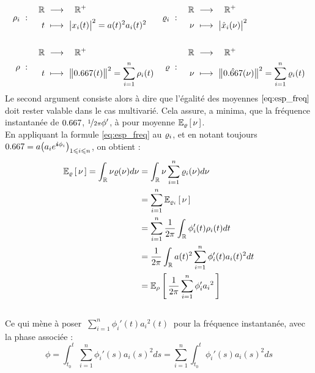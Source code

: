 \begin{align*}%
	\densit_i\ &:\quad \begin{aligned}\R\ &\lr\quad \R^+ \\ t\ &\longmapsto\ \big|x_i(t)\big|^2 = a(t)^2 a_i(t)^2 \end{aligned}  
	&
	\densis_i\ &:\quad \begin{aligned}\R\ &\lr\quad \R^+ \\ \nu\ &\longmapsto\ \big|\fou{x}_i(\nu)\big|^2 \end{aligned} \\ \\
	\densit\ &:\quad \begin{aligned}\R\ &\lr\quad \R^+ \\ t\ &\longmapsto\ \big\|\x(t)\big\|^2 = \sum_{i=1}^n \densit_i(t) \end{aligned}  
	&
	\densis\ &:\quad \begin{aligned}\R\ &\lr\quad \R^+ \\ \nu\ &\longmapsto\ \big\|\fou{\x}(\nu)\big\|^2 = \sum_{i=1}^n \densis_i(t) \end{aligned}	
\end{align*}
Le second argument consiste alors à dire que l'égalité des moyennes $\eqref{eq:esp_freq}$ doit rester valable dans le cas multivarié. Cela assure, a minima, que la fréquence instantanée de $\x$, $\nicefrac{1}{2\pi}\phi'$, à pour moyenne $\esp[\densis]{\nu}$.
\\

En appliquant la formule \eqref{eq:esp_freq} au $\densis_i$, et en notant toujours $\x = a\big(a_ie^{\i \phi_i}\big)_{1\leq i\leq n}$, on obtient :
\begin{align*}
	\esp[\densis]{\nu} = \int_\R \nu\densis(\nu)d\nu &= \int_\R \nu\sum_{i=1}^n \densis_i(\nu) d\nu \\
	&= \sum_{i=1}^n\esp[\densis_i]{\nu} \\
	&= \sum_{i=1}^n\frac{1}{2\pi}\int_\R \phi_i'(t)\densit_i(t)dt \\
	&= \frac{1}{2\pi}\int_\R a(t)^2\sum_{i=1}^n\phi_i'(t)a_i(t)^2 dt \\
	&= \esp[\densit]{\frac{1}{2\pi}\sum_{i=1}^n \phi_i'{a_i}^2}
\end{align*}
\\
Ce qui mène à poser $\displaystyle \ \sum_{i=1}^n \phi_i'(t){a_i}^2(t)\ $ pour la fréquence instantanée, avec la phase associée :
\begin{equation}\label{eq:phas_inst_v2}
	\phi = \int_{t_0}^t \sum_{i=1}^n \phi_i'(s){a_i}(s)^2ds 
	= \sum_{i=1}^n \int_{t_0}^t \phi_i'(s){a_i}(s)^2ds 
\end{equation}
\\

